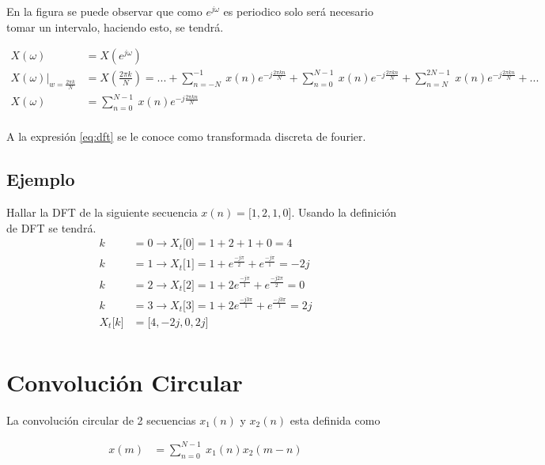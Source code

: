 \documentclass[12pt]{article}
\begin{document}
En la figura se puede observar que como $e^{j\omega}$ es periodico solo será necesario tomar un intervalo, haciendo esto, se tendrá.

\begin{equation}
    \begin{split}
        X(\omega)&=X(e^{j\omega})\\
        X(\omega)|_{w=\frac{2\pi k}{N}}&=X(\frac{2\pi k}{N})=...+\displaystyle\sum_{n=-N}^{-1}\ x(n)e^{-j\frac{2\pi kn}{N}}+\displaystyle\sum_{n=0}^{N-1}\ x(n)e^{-j\frac{2\pi kn}{N}}+\displaystyle\sum_{n=N}^{2N-1}\ x(n)e^{-j\frac{2\pi kn}{N}}+...\\
        X(\omega)&=\displaystyle\sum_{n=0}^{N-1}\ x(n)e^{-j\frac{2\pi kn}{N}}\\    
    \end{split}
    \label{eq:dft}
\end{equation}

A la expresión \ref{eq:dft} se le conoce como transformada discreta de fourier.
\subsection{Ejemplo}

Hallar la DFT de la siguiente secuencia $x(n)=\lbrack 1,2,1,0\rbrack$. Usando la definición de DFT se tendrá.
\begin{equation}
    \begin{split}
        k&=0\to X_t\lbrack0\rbrack=1+2+1+0=4\\
        k&=1\to X_t\lbrack1\rbrack=1+e^{\frac{-j\pi}{2}}+e^{\frac{-j\pi}{1}}=-2j\\
        k&=2\to X_t\lbrack2\rbrack=1+2e^{\frac{-j\pi}{1}}+e^{\frac{-j2\pi}{2}}=0\\
        k&=3\to X_t\lbrack3\rbrack=1+2e^{\frac{-j3\pi}{1}}+e^{\frac{-j3\pi}{1}}=2j\\
        X_t\lbrack k\rbrack&=\lbrack4,-2j,0,2j \rbrack\\
    \end{split}
    \label{eq:example_dft}
\end{equation}

\section{Convolución Circular}
La convolución circular de 2 secuencias $x_1(n)$ y $x_2(n)$ esta definida como

\begin{equation}
    \begin{split}
        x(m)&=\displaystyle\sum_{n=0}^{N-1}\ x_1(n)x_2(m-n)\\    
    \end{split}
    \label{eq:circular}
\end{equation}
\end{document}
